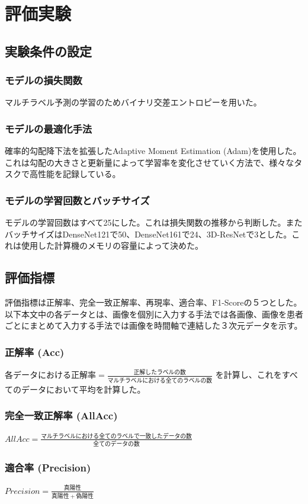 \section{評価実験}
\subsection{実験条件の設定}
\subsubsection{モデルの損失関数}
マルチラベル予測の学習のためバイナリ交差エントロピーを用いた。
\subsubsection{モデルの最適化手法}
確率的勾配降下法を拡張したAdaptive Moment Estimation (Adam)を使用した。これは勾配の大きさと更新量によって学習率を変化させていく方法で、様々なタスクで高性能を記録している。
\subsubsection{モデルの学習回数とバッチサイズ}
モデルの学習回数はすべて25にした。これは損失関数の推移から判断した。またバッチサイズはDenseNet121で50、DenseNet161で24、3D-ResNetで3とした。これは使用した計算機のメモリの容量によって決めた。
\subsection{評価指標}
評価指標は正解率、完全一致正解率、再現率、適合率、F1-Scoreの５つとした。
以下本文中の各データとは、画像を個別に入力する手法では各画像、画像を患者ごとにまとめて入力する手法では画像を時間軸で連結した３次元データを示す。
\subsubsection{正解率 (Acc)}
$各データにおける正解率 = \frac{正解したラベルの数}{マルチラベルにおける全てのラベルの数}$
を計算し、これをすべてのデータにおいて平均を計算した。
\subsubsection{完全一致正解率 (AllAcc)}
$AllAcc=\frac{マルチラベルにおける全てのラベルで一致したデータの数}{全てのデータの数}$
\subsubsection{適合率 (Precision)}
$Precision = \frac{真陽性}{真陽性+偽陽性}$

